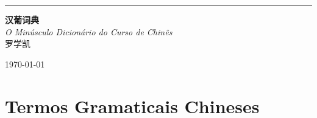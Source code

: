 \documentclass[a4paper,10pt,twoside,openany]{memoir}
\makeatletter
\def\fake@makechapterhead#1{%
  \vspace*{50\p@}%
  {\parindent \z@ \raggedright \normalfont
    \ifnum \c@secnumdepth >\m@ne
        \huge\bfseries \strut%
        \par\nobreak
        \vskip 20\p@
    \fi
    \interlinepenalty\@M
    \Huge \bfseries #1\par\nobreak
    \vskip 40\p@
  }
  \markboth{#1}{\thechapter}
}
\newcommand{\newchapterhead}{\let\@makechapterhead\fake@makechapterhead}
\makeatother
\begin{document}
\newchapterhead

\begin{titlingpage} %
	
	\raggedleft %
	
	\rule{1pt}{\textheight} %
	\hspace{0.05\textwidth} %
	\parbox[b]{0.75\textwidth}{ %
		
		{\Huge\bfseries 汉葡词典}\\[2\baselineskip] %
		{\large\textit{O Minúsculo Dicionário do Curso de Chinês}}\\[4\baselineskip] %
		{\Large\textsc{罗学凯}} %
		
		\vspace{0.5\textheight} %
		
		{\noindent \today}\\[\baselineskip] %
	}

\end{titlingpage}

\tableofcontents

\newpage

\chapter{Termos Gramaticais Chineses}
\end{document}
